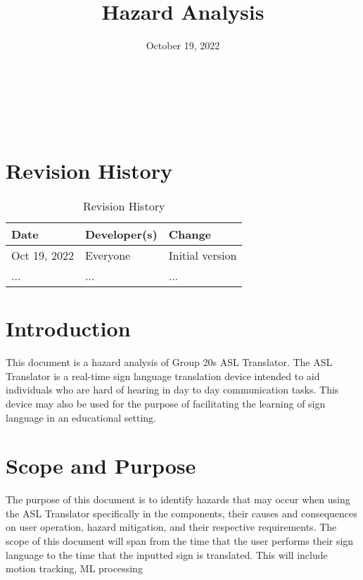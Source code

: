 \documentclass{article}
\title{Hazard Analysis\\\progname}
\author{\authname}
\date{October 19, 2022}
\begin{document}
\maketitle

~\newpage

\tableofcontents
\listoftables

~\newpage

\section*{Revision History}
\begin{table}[hp]
\caption{Revision History} \label{TblRevisionHistory}
\begin{tabularx}{\textwidth}{llX}
\toprule
\textbf{Date} & \textbf{Developer(s)} & \textbf{Change}\\
\midrule
Oct 19, 2022 & Everyone & Initial version\\

... & ... & ...\\
\bottomrule
\end{tabularx}
\end{table}

\newpage
\textheight 9in

\section{Introduction}

This document is a hazard analysis of Group 20\textquotesingle s ASL Translator. The ASL Translator is a real-time sign language translation device intended to aid 
individuals who are hard of hearing in day to day communication tasks. This device may also be used for the purpose of facilitating the learning of 
sign language in an educational setting.\\

\section{Scope and Purpose}

The purpose of this document is to identify hazards that may occur when using the ASL Translator specifically in the components, their causes and consequences on user 
operation, hazard mitigation, and their respective requirements. The scope of this document will span from the time that the user performs their sign language to the
time that the inputted sign is translated. This will include motion tracking, ML processing \\
\end{document}
